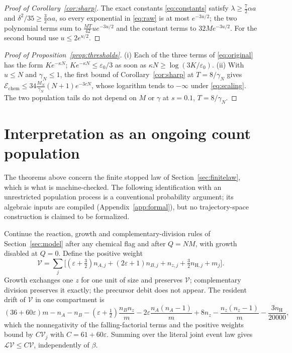 \documentclass[11pt,a4paper]{article}
\theoremstyle{plain}
\theoremstyle{definition}
\theoremstyle{remark}
\newcommand{\cL}{\mathcal L}
\newcommand{\cV}{\mathcal V}
\newcommand{\eps}{\varepsilon}
\newcommand{\chem}{\mathcal E_{\mathrm{chem}}}
\newcommand{\Hs}{\mathrm H}
\begin{document}
\begin{proof}[Proof of Corollary~\ref{cor:sharp}]
The exact constants \eqref{eq:constants} satisfy $\lambda\geq\frac72\alpha a$ and $\delta^2/35\geq\frac32\alpha a$, so every exponential in \eqref{eq:raw} is at most $e^{-3u/2}$; the two polynomial terms sum to $\frac{MT}{42}ue^{-3u/2}$ and the constant terms to $32Me^{-3u/2}$. For the second bound use $u\leq2e^{u/2}$.
\end{proof}

\begin{proof}[Proof of Proposition~\ref{prop:thresholds}]
(i) Each of the three terms of \eqref{eq:original} has the form $Ke^{-\kappa N}$; $Ke^{-\kappa N}\leq\eps_0/3$ as soon as $\kappa N\geq\log(3K/\eps_0)$. (ii) With $u\leq N$ and $\gamma_N\leq1$, the first bound of Corollary~\ref{cor:sharp} at $T=8/\gamma_N$ gives $\chem\leq34\frac{M_N}{\gamma_N}(N+1)e^{-3cN}$, whose logarithm tends to $-\infty$ under \eqref{eq:scaling}. The two population tails do not depend on $M$ or $\gamma$ at $s=0.1$, $T=8/\gamma_N$.
\end{proof}

\section{Interpretation as an ongoing count population}\label{sec:localization}

The theorems above concern the finite stopped law of Section~\ref{sec:finitelaw}, which is what is machine-checked. The following identification with an unrestricted population process is a conventional probability argument; its algebraic inputs are compiled (Appendix~\ref{app:formal}), but no trajectory-space construction is claimed to be formalized.

Continue the reaction, growth and complementary-division rules of Section~\ref{sec:model} after any chemical flag and after $Q=NM$, with growth disabled at $Q=0$. Define the positive weight
\begin{equation}\label{eq:weight}
\cV=\sum_j\Big[(\eps+\tfrac32)n_{A,j}+(2\eps+1)n_{B,j}+n_{z,j}+\tfrac32n_{\Hs,j}+m_j\Big].
\end{equation}
Growth exchanges one $z$ for one unit of size and preserves $\cV$; complementary division preserves it exactly; the precursor debit does not appear. The resident drift of $\cV$ in one compartment is
\[
(36+60\eps)m-n_A-n_B-(\eps+\tfrac12)\frac{n_Bn_z}m-2\eps\frac{n_A(n_A-1)}m+8n_z-\frac{n_z(n_z-1)}m-\frac{3n_\Hs}{20000},
\]
which the nonnegativity of the falling-factorial terms and the positive weights bound by $C\cV_j$ with $C=61+60\eps$. Summing over the literal joint event law gives $\cL\cV\leq C\cV$, independently of $\beta$.
\end{document}
